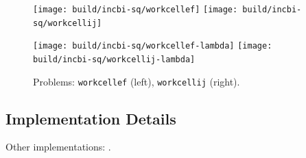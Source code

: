 \begin{figure}
   \centering
   \texttt{[image: build/incbi-sq/workcellef]}
   \texttt{[image: build/incbi-sq/workcellij]}
   
   \texttt{[image: build/incbi-sq/workcellef-lambda]}
   \texttt{[image: build/incbi-sq/workcellij-lambda]}
   \caption{Problems: \texttt{workcellef} (left), \texttt{workcellij} (right).}
\end{figure}

\subsection{Implementation Details}

Other implementations:
\citep{alberts1998softwaredynamicgraph}.
